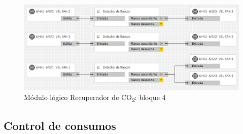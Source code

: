 \begin{figure}[H]
\centering
\includegraphics[width=1.15\textwidth]{figures/log_co2_b4.png}   
\caption{Módulo lógico Recuperador de CO\textsubscript{2}: bloque 4}
\label{fig:log_co2_b4}
\end{figure}


\subsection{Control de consumos}


